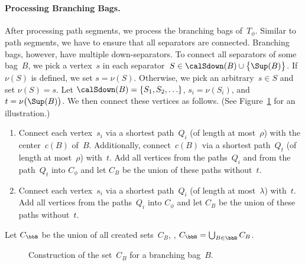 \paragraph{Processing Branching Bags.}
After processing path segments, we process the branching bags of~$T_\phi$.
Similar to path segments, we have to ensure that all separators are connected.
Branching bags, however, have multiple down-separators.
To connect all separators of some bag~$B$, we pick a vertex~$s$ in each separator~$S \in \calSdown(B) \cup \big \{ \Sup(B) \big \}$.
If $\nu(S)$ is defined, we set $s = \nu(S)$.
Otherwise, we pick an arbitrary~$s \in S$ and set $\nu(S) = s$.
Let $\calSdown(B) = \{ S_1, S_2, \ldots \}$, $s_i = \nu(S_i)$, and $t = \nu \big( \Sup(B) \big)$.
We then connect these vertices as follows.
(See Figure~\ref{fig:branchingBagConstr} for an illustration.)
\begin{enumerate}[\rHrt]
    \item[\rHrt]
        Connect each vertex~$s_i$ via a shortest path~$Q_i$ (of length at most~$\rho$) with the center~$c(B)$ of~$B$.
        Additionally, connect~$c(B)$ via a shortest path~$Q_t$ (of length at most~$\rho$) with~$t$.
        Add all vertices from the paths~$Q_i$ and from the path~$Q_t$ into $C_\phi$ and let $C_B$ be the union of these paths without~$t$.
    \item[\rDmd]
        Connect each vertex~$s_i$ via a shortest path~$Q_i$ (of length at most~$\lambda$) with~$t$.
        Add all vertices from the paths~$Q_i$ into $C_\phi$ and let $C_B$ be the union of these paths without~$t$.
\end{enumerate}
Let $C_\bbB$ be the union of all created sets~$C_B$, \ie, $C_\bbB = \bigcup_{B \in \bbB} C_B$.

\begin{figure}
    [htb]
    \centering
    \renewcommand\thesubfigure{}
    \captionsetup[subfigure]{labelformat=simple,labelsep=none}
    \begin{subfigure}[b]{0.45\textwidth}
        \centering
        
        \caption{\rHrt}
    \end{subfigure}
    \hfil
    \begin{subfigure}[b]{0.45\textwidth}
        \centering
        
        \caption{\rDmd}
    \end{subfigure}%

    \caption
    {%
        Construction of the set~$C_B$ for a branching bag~$B$.
    }
    \label{fig:branchingBagConstr}
\end{figure}

